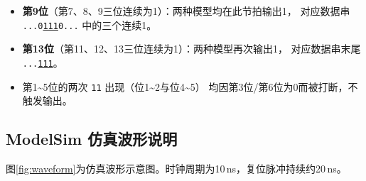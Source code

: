 \documentclass[12pt,a4paper]{article}
\begin{document}
\begin{itemize}
  \item \textbf{第9位}（第7、8、9三位连续为1）：两种模型均在此节拍输出1，
        对应数据串 \texttt{...0\underline{111}0...} 中的三个连续1。
  \item \textbf{第13位}（第11、12、13三位连续为1）：两种模型再次输出1，
        对应数据串末尾 \texttt{...\underline{111}}。
  \item 第1\textasciitilde5位的两次 \texttt{11} 出现（位1\textasciitilde2与位4\textasciitilde5）
        均因第3位/第6位为0而被打断，不触发输出。
\end{itemize}

\subsection{ModelSim 仿真波形说明}

图\ref{fig:waveform}为仿真波形示意图。时钟周期为10\,ns，复位脉冲持续约20\,ns。
\end{document}
